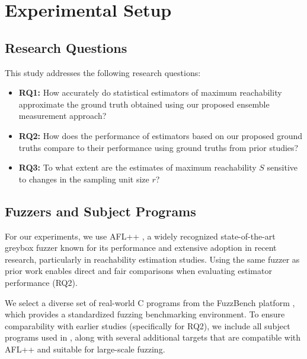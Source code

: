 \documentclass[conference]{IEEEtran}
\begin{document}


\section{Experimental Setup} \label{sec:setup}

\subsection{Research Questions}

This study addresses the following research questions:

\begin{itemize}
    \item \textbf{RQ1:} How accurately do statistical estimators of maximum reachability approximate the ground truth obtained using our proposed ensemble measurement approach?
    
    \item \textbf{RQ2:} How does the performance of estimators based on our proposed ground truths compare to their performance using ground truths from prior studies?
    
    \item \textbf{RQ3:} To what extent are the estimates of maximum reachability $S$ sensitive to changes in the sampling unit size $r$?
\end{itemize}

\subsection{Fuzzers and Subject Programs}

For our experiments, we use AFL++ \cite{fioraldi2020AFL++}, a widely recognized state-of-the-art greybox fuzzer known for its performance and extensive adoption in recent research, particularly in reachability estimation studies. Using the same fuzzer as prior work enables direct and fair comparisons when evaluating estimator performance (RQ2).

We select a diverse set of real-world C programs from the FuzzBench platform \cite{metzman2021fuzzbench}, which provides a standardized fuzzing benchmarking environment. To ensure comparability with earlier studies (specifically for RQ2), we include all subject programs used in \cite{liyanage2023reachable}, along with several additional targets that are compatible with AFL++ and suitable for large-scale fuzzing.
\end{document}
